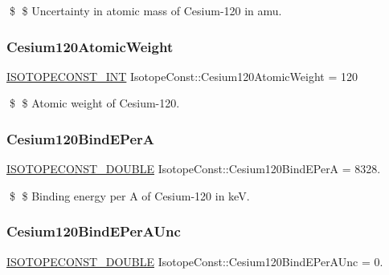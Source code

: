 \$ \$ Uncertainty in atomic mass of Cesium-\/120 in amu. \mbox{\label{group___isotope_const-_cesium-_cs120_gaeb0bf6c3edd4b16175b72688509fdbf3}} 
\subsubsection{\texorpdfstring{Cesium120\+Atomic\+Weight}{Cesium120AtomicWeight}}
{\footnotesize\ttfamily \mbox{\hyperlink{group___isotope_const-_macros_ga5f18360b3e99483a35c32d789e62621c}{I\+S\+O\+T\+O\+P\+E\+C\+O\+N\+S\+T\+\_\+\+I\+NT}} Isotope\+Const\+::\+Cesium120\+Atomic\+Weight = 120}

\$ \$ Atomic weight of Cesium-\/120. \mbox{\label{group___isotope_const-_cesium-_cs120_gae5f666b0d3164c042156a6070896f43f}} 
\subsubsection{\texorpdfstring{Cesium120\+Bind\+E\+PerA}{Cesium120BindEPerA}}
{\footnotesize\ttfamily \mbox{\hyperlink{group___isotope_const-_macros_ga8f45a7272ce02c0b4c65c44636ed719a}{I\+S\+O\+T\+O\+P\+E\+C\+O\+N\+S\+T\+\_\+\+D\+O\+U\+B\+LE}} Isotope\+Const\+::\+Cesium120\+Bind\+E\+PerA = 8328.}

\$ \$ Binding energy per A of Cesium-\/120 in keV. \mbox{\label{group___isotope_const-_cesium-_cs120_gad02e140bc3ada6620d10e2f7dd365c45}} 
\subsubsection{\texorpdfstring{Cesium120\+Bind\+E\+Per\+A\+Unc}{Cesium120BindEPerAUnc}}
{\footnotesize\ttfamily \mbox{\hyperlink{group___isotope_const-_macros_ga8f45a7272ce02c0b4c65c44636ed719a}{I\+S\+O\+T\+O\+P\+E\+C\+O\+N\+S\+T\+\_\+\+D\+O\+U\+B\+LE}} Isotope\+Const\+::\+Cesium120\+Bind\+E\+Per\+A\+Unc = 0.}

